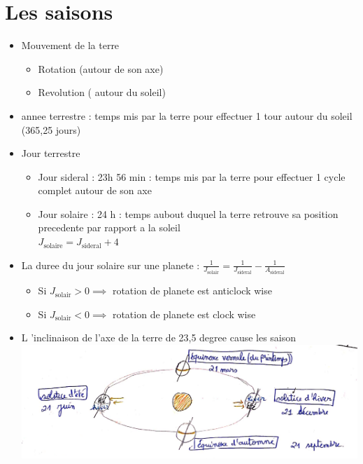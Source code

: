 \documentclass[12pt]{book}
\begin{document}
    \chapter{Les saisons}
        \begin{itemize}
            \item Mouvement de la terre 
                \begin{itemize}
                    \item Rotation (autour de son axe)
                    \item Revolution ( autour du soleil)
                \end{itemize}
            \item annee terrestre : temps mis par la terre pour effectuer 1 tour autour du soleil (365,25 jours)
            \item Jour terrestre 
                \begin{itemize}
                    \item Jour sideral : 23h 56 min : temps mis par la terre pour effectuer 1 cycle complet autour de son axe 
                    \item Jour solaire : 24 h : temps aubout duquel la terre retrouve sa position precedente par rapport a la soleil \\
                        $ J_{\text{solaire}} = J_{\text{sideral}} + 4 $
                \end{itemize}
            \item La duree du jour solaire sur une planete : $ \frac{1}{J_{\text{solair}}} = \frac{1}{J_{\text{sideral}}} - \frac{1}{A_{\text{sideral}}} $
                \begin{itemize}
                    \item  Si $ J_\text{solair} > 0 \implies  $ rotation de planete est anticlock wise
                    \item Si $ J_\text{solair} < 0 \implies  $ rotation de planete est clock wise 
                \end{itemize}
            \pagebreak
            \item L 'inclinaison de l'axe de la terre de 23,5 degree cause les saison\\
                    \includegraphics[width=1\linewidth]{pic/seasons.png}

\end{itemize}
\end{document}
